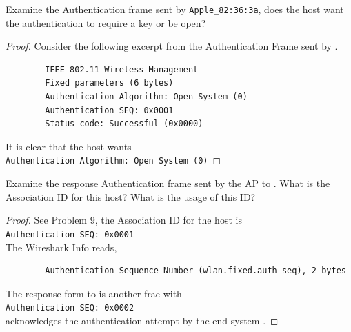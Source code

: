 \documentclass[../main.tex]{subfiles}
\begin{document}
\begin{wts}
    Examine the Authentication frame sent by \lstinline{Apple_82:36:3a}, does the host want the authentication to require a key or be open?
\end{wts}
\begin{proof}
    Consider the following excerpt from the Authentication Frame sent by \apple.
    \begin{lstlisting}
        IEEE 802.11 Wireless Management
        Fixed parameters (6 bytes)
        Authentication Algorithm: Open System (0)
        Authentication SEQ: 0x0001
        Status code: Successful (0x0000)
    \end{lstlisting}
    It is clear that the host wants\\
    \lstinline{Authentication Algorithm: Open System (0)}
\end{proof}
\newpage

\begin{wts}
    Examine the response Authentication frame sent by the AP to \apple. What is the Association ID for this host? What is the usage of this ID?
\end{wts}
\begin{proof}
    See Problem 9, the Association ID for the host is\\
    \lstinline{Authentication SEQ: 0x0001}\\
    The Wireshark Info reads,
    \begin{lstlisting}
        Authentication Sequence Number (wlan.fixed.auth_seq), 2 bytes
    \end{lstlisting}
    The response form \cisco to \apple is another frae with \\
    \lstinline{Authentication SEQ: 0x0002}\\
    acknowledges the authentication attempt by the end-system \apple.
\end{proof}
\newpage
\end{document}
